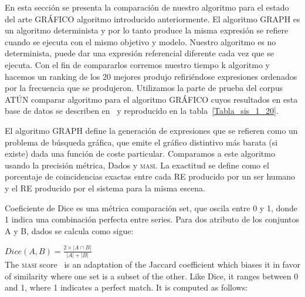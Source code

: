 

En esta secci\'on se presenta la comparaci\'on de nuestro algoritmo para el estado del arte GR\'AFICO algoritmo introducido anteriormente. El algoritmo GRAPH es un algoritmo determinista y por lo tanto produce la misma expresi\'on se refiere cuando se ejecuta con el mismo objetivo y modelo. Nuestro algoritmo es no determinista, puede dar una expresi\'on referencial diferente cada vez que se ejecuta. Con el fin de compararlos corremos nuestro tiempo k algoritmo y hacemos un ranking de los 20 mejores produjo refiri\'endose expresiones ordenados por la frecuencia que se produjeron. Utilizamos la parte de prueba del corpus AT\'UN comparar algoritmo para el algoritmo GR\'AFICO cuyos resultados en esta base de datos se describen en~\cite{KrahmerGRAPH} y reproducido en la tabla~\ref{Tabla_sis_1_20}.

El algoritmo GRAPH define la generaci\'on de expresiones que se refieren como un problema de b\'usqueda gr\'afica, que emite el gr\'afico distintivo m\'as barata (si existe) dada una funci\'on de coste particular. Comparamos a este algoritmo usando la precisi\'on m\'etrica, Dados y \textsc {masi}. La exactitud se define como el porcentaje de coincidencias exactas entre cada RE producido por un ser humano y el RE producido por el sistema para la misma escena.

Coeficiente de Dice es una m\'etrica comparaci\'on set, que oscila entre 0 y 1, donde
1 indica una combinaci\'on perfecta entre series. Para dos
atributo de los conjuntos A y B, dados se calcula como sigue:


$Dice(A,B) = \frac{2\times|A \cap B|}{|A|+|B|}$\\


The \textsc{masi} score \cite{Passonneau06measuringagreement}~is an adaptation of the Jaccard coefficient
which biases it in favor of similarity where one set
is a subset of the other. Like Dice, it ranges between
0 and 1, where 1 indicates a perfect match. It is computed as follows:\\


